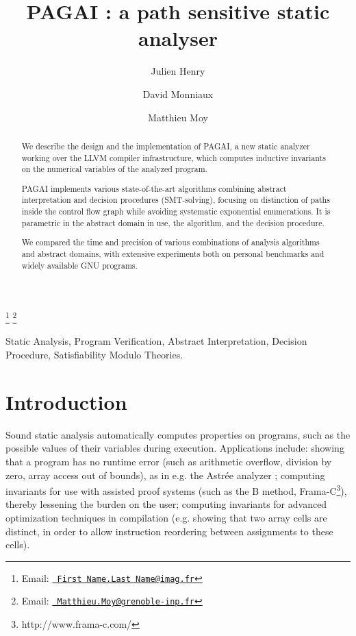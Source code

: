 \documentclass{entcs}
\begin{document}
\begin{frontmatter}
  \title{PAGAI : a path sensitive static analyser} 
  \author{Julien Henry }
  \address{Universit\'e Joseph Fourier, VERIMAG\\
    Grenoble, France} 
	\author{David Monniaux}
  \address{CNRS, VERIMAG\\
    Grenoble, France} 
	\author{Matthieu Moy}
  \address{Grenoble-INP, VERIMAG\\
    Grenoble, France} 
	
    \thanks[imag.fr]{Email:
    \href{First Name.Last Name@imag.fr} {\texttt{\normalshape
        First Name.Last Name@imag.fr}}} 
    \thanks[grenoble-inp.fr]{Email:
    \href{Matthieu.Moy@grenoble-inp.fr} {\texttt{\normalshape
        Matthieu.Moy@grenoble-inp.fr}}} 
\begin{abstract} 
	We describe the design and the implementation of PAGAI,
        a new static analyzer working over the LLVM compiler infrastructure,
        which computes inductive invariants on the numerical variables of the
        analyzed program.

	PAGAI implements various state-of-the-art algorithms combining abstract
	interpretation and decision procedures (SMT-solving),
        focusing on distinction of paths inside the control flow graph while
        avoiding systematic exponential enumerations.
        It is parametric in the abstract domain in use, the algorithm,
        and the decision procedure.

	We compared the time and precision of various combinations of
	analysis algorithms and abstract domains, with extensive
        experiments both on personal benchmarks and widely available
        GNU programs.
\end{abstract}
\begin{keyword}
	Static Analysis, Program Verification, Abstract Interpretation, Decision
	Procedure, Satisfiability Modulo Theories.
\end{keyword}
\end{frontmatter}
\section{Introduction}\label{intro}
Sound static analysis automatically computes properties on programs, such as the possible values of their variables during execution.
Applications include:
showing that a program has no runtime error (such as arithmetic overflow, division by zero, array access out of bounds), as in e.g. the Astrée analyzer \cite{ASTREE_ESOP05};
computing invariants for use with assisted proof systems (such as the B method, Frama-C\footnote{http://www.frama-c.com/}), thereby lessening the burden on the user;
computing invariants for advanced optimization techniques in compilation (e.g. showing that two array cells are distinct, in order to allow instruction reordering between assignments to these cells).
\end{document}
